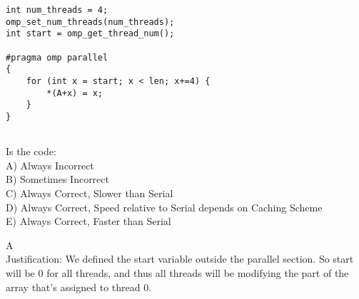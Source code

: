 \begin{blocksection}

\question
\begin{verbatim}
int num_threads = 4;
omp_set_num_threads(num_threads); 
int start = omp_get_thread_num();

#pragma omp parallel 
{ 
    for (int x = start; x < len; x+=4) { 
        *(A+x) = x; 
    } 
} 


\end{verbatim}

Is the code: \\
A) Always Incorrect \\
B) Sometimes Incorrect \\ 
C) Always Correct, Slower than Serial \\
D) Always Correct, Speed relative to Serial depends on Caching Scheme \\
E) Always Correct, Faster than Serial \\

\begin{solution}[0.5in]
A \\
Justification: We defined the start variable outside the parallel section. So start will be 0 for all threads, and thus all threads will be modifying the part of the array that’s assigned to thread 0. 

\end{solution}
\end{blocksection}